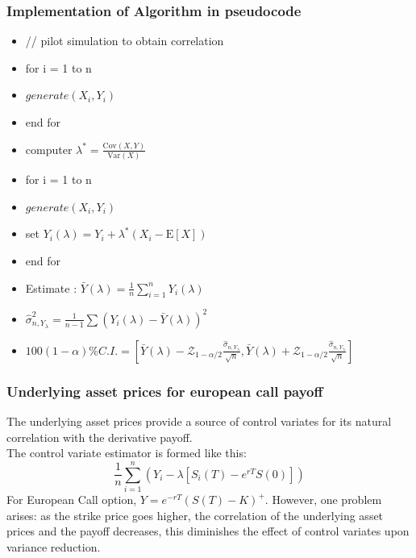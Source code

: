 \documentclass{beamer}
\begin{document}
\begin{frame}
\frametitle{Implementation of Algorithm in pseudocode}
\begin{itemize}
	\item // pilot simulation to obtain correlation
	\item for i = 1 to n
	\item \quad $generate(X_{i}, Y_{i})$
	\item end for
	\item computer $\lambda^{*} = \frac{\mathrm{Cov}(X,Y)}{\mathrm{Var}(X)}$
	\item for i = 1 to n
	\item \quad $generate(X_{i}, Y_{i})$
	\item \quad set ${Y}_{i}(\lambda) = Y_{i} + \lambda^{*}(X_{i}-\mathrm{E}[X])$
	\item end for
	\item Estimate : $\bar{Y}(\lambda) = \frac{1}{n} \sum_{i=1}^{n} {Y}_{i}(\lambda)$
	\item $\hat{\sigma}_{n, Y_{\lambda}}^{2} = \frac{1}{n-1} \sum({Y}_{i}(\lambda)-\bar{Y}(\lambda))^{2}$
	\item $100(1-\alpha)\% C.I. = [\bar{Y}(\lambda) - \mathcal{Z}_{1-\alpha/2} \frac{\hat{\sigma}_{n, Y_{\lambda}}}{\sqrt{n}}, \bar{Y}(\lambda) + \mathcal{Z}_{1-\alpha/2} \frac{\hat{\sigma}_{n, Y_{\lambda}}}{\sqrt{n}}] $
\end{itemize}
\end{frame}

\begin{frame}
\frametitle{Underlying asset prices for european call payoff}
The underlying asset prices provide a source of control variates for its natural correlation with the derivative payoff.\\
The control variate estimator is formed like this:
$$ \frac{1}{n}\sum_{i=1}^{n}(Y_{i}-\lambda[S_{i}(T)-e^{rT}S(0)])$$
For European Call option, $Y = e^{-rT}(S(T)-K)^{+}$.
However, one problem arises: as the strike price goes higher, the correlation of the underlying asset prices and the payoff decreases, this diminishes the effect of control variates upon variance reduction.
\end{frame}
\end{document}
